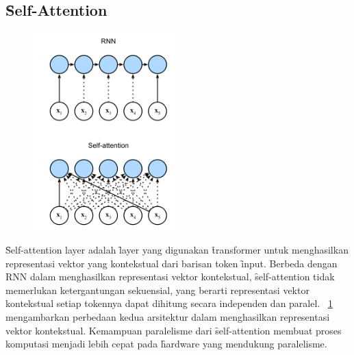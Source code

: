 	\subsection{\f{Self-Attention}}
	\begin{figure}[!ht]
		\centering
		\includegraphics[width=0.5\textwidth]{assets/pics/rnn-compare-selfattention.png}
		\label{fig:self-attention-rnn}
	\end{figure}

	\f{Self-attention layer} adalah \f{layer} yang digunakan \f{transformer} untuk menghasilkan representasi vektor yang kontekstual dari barisan token \f{input}. Berbeda dengan RNN dalam menghasilkan representasi vektor kontekstual, \f{self-attention} tidak memerlukan ketergantungan sekuensial, yang berarti representasi vektor kontekstual setiap tokennya dapat dihitung secara independen dan paralel. \pic~\ref{fig:self-attention-rnn} mengambarkan perbedaan kedua arsitektur dalam menghasilkan representasi vektor kontekstual. Kemampuan paralelisme dari \f{self-attention} membuat proses komputasi menjadi lebih cepat pada \f{hardware} yang mendukung paralelisme. 

